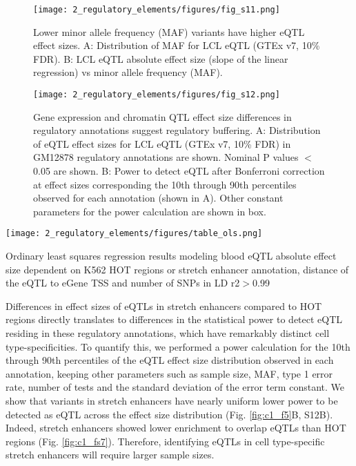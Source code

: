 \begin{figure}
    \centering
    \texttt{[image: 2\_regulatory\_elements/figures/fig\_s11.png]}
    \caption[Lower minor allele frequency (MAF) variants have higher eQTL effect sizes]{Lower minor allele frequency (MAF) variants have higher eQTL effect sizes. A: Distribution of MAF for LCL eQTL (GTEx v7, 10\% FDR). B: LCL eQTL absolute effect size (slope of the linear regression) vs minor allele frequency (MAF).}
    \label{fig:c1_fs11}
\end{figure}

\begin{figure}
    \centering
    \texttt{[image: 2\_regulatory\_elements/figures/fig\_s12.png]}
    \caption[Gene expression and chromatin QTL effect size differences in regulatory annotations suggest regulatory buffering]{Gene expression and chromatin QTL effect size differences in regulatory annotations suggest regulatory buffering. A: Distribution of eQTL effect sizes for LCL eQTL (GTEx v7, 10\% FDR) in GM12878 regulatory annotations are shown. Nominal P values $<$ 0.05 are shown. B: Power to detect eQTL after Bonferroni correction at effect sizes corresponding the 10th through 90th percentiles observed for each annotation (shown in A). Other constant parameters for the power calculation are shown in box.
}
    \label{fig:c1_fs12}
\end{figure}

\begin{table}
  \centering
  \texttt{[image: 2\_regulatory\_elements/figures/table\_ols.png]}
  \caption[Regression results modeling eQTL effect size and regulatory annotation, distance to gene TSS and number of SNPs in LD]{Ordinary least squares regression results modeling blood eQTL absolute effect size dependent on K562 HOT regions or stretch enhancer annotation, distance of the eQTL to eGene TSS and number of SNPs in LD r2$>$0.99}
  \label{tbl:c1_t1}
  
\end{table}  

Differences in effect sizes of eQTLs in stretch enhancers compared to HOT regions directly translates to differences in the statistical power to detect eQTL residing in these regulatory annotations, which have remarkably distinct cell type-specificities. To quantify this, we performed a power calculation for the 10th through 90th percentiles of the eQTL effect size distribution observed in each annotation, keeping other parameters such as sample size, MAF, type 1 error rate, number of tests and the standard deviation of the error term constant. We show that variants in stretch enhancers have nearly uniform lower power to be detected as eQTL across the effect size distribution (Fig. \ref{fig:c1_f5}B, S12B). Indeed, stretch enhancers showed lower enrichment to overlap eQTLs than HOT regions (Fig. \ref{fig:c1_fs7}). Therefore, identifying eQTLs in cell type-specific stretch enhancers will require larger sample sizes. \\

